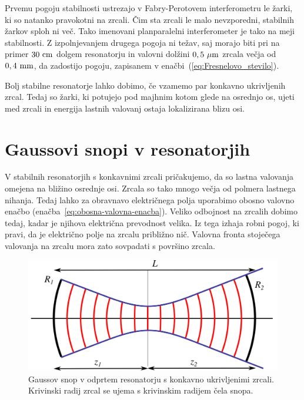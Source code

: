 Prvemu pogoju stabilnosti ustrezajo v Fabry-Perotovem interferometru
le žarki, ki so natanko pravokotni na zrcali. Čim sta zrcali le
malo nevzporedni, stabilnih žarkov sploh ni več. Tako imenovani planparalelni 
interferometer je tako na meji stabilnosti. Z izpolnjevanjem drugega
pogoja ni težav, saj morajo biti pri na primer $30~\centi\metre$ dolgem resonatorju in 
valovni dolžini $0,5~\mu\metre$ zrcala večja od $0,4~\milli\metre$, da zadostijo pogoju, 
zapisanem v enačbi~(\ref{eq:Fresnelovo_stevilo}).

Bolj stabilne resonatorje lahko dobimo, če vzamemo par konkavno ukrivljenih
zrcal. Tedaj so žarki, ki potujejo pod majhnim kotom glede na osrednjo os, ujeti
med zrcali in energija lastnih valovanj ostaja lokalizirana blizu
osi.

\section{Gaussovi snopi v resonatorjih}
V stabilnih resonatorjih s konkavnimi zrcali pričakujemo, da so
lastna valovanja omejena na bližino osrednje osi. Zrcala so tako mnogo 
večja od polmera lastnega nihanja. Tedaj lahko za obravnavo
električnega polja uporabimo obosno valovno enačbo (enačba~\ref{eq:obosna-valovna-enacba}). 
Veliko odbojnost na zrcalih dobimo tedaj, kadar je njihova električna prevodnost velika. 
Iz tega izhaja robni pogoj, ki pravi, da je električno polje na zrcalu 
približno nič. Valovna fronta stoječega valovanja na zrcalu mora zato 
sovpadati s površino zrcala.

\begin{figure}[h]
\centering
\includegraphics[width=11truecm]{slike/04_Resonator_Gauss.png}
\caption{Gaussov snop v odprtem resonatorju s konkavno ukrivljenimi zrcali. 
Krivinski radij zrcal se ujema s krivinskim radijem čela snopa.}
\label{fig:Gaussov-snop-v-resonatorju}
\end{figure}

